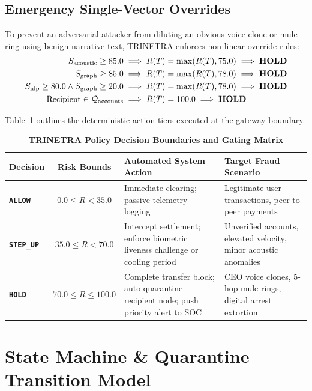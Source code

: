 \documentclass[11pt,a4paper]{article}
\begin{document}
\subsection{Emergency Single-Vector Overrides}
To prevent an adversarial attacker from diluting an obvious voice clone or mule ring using benign narrative text, TRINETRA enforces non-linear override rules:
\begin{align}
    S_{\text{acoustic}} \ge 85.0 &\implies R(T) = \max(R(T), 75.0) \implies \text{\textbf{HOLD}}\\
    S_{\text{graph}} \ge 85.0 &\implies R(T) = \max(R(T), 78.0) \implies \text{\textbf{HOLD}}\\
    S_{\text{nlp}} \ge 80.0 \land S_{\text{graph}} \ge 20.0 &\implies R(T) = \max(R(T), 78.0) \implies \text{\textbf{HOLD}}\\
    \text{Recipient} \in \mathcal{Q}_{\text{accounts}} &\implies R(T) = 100.0 \implies \text{\textbf{HOLD}}
\end{align}

Table~\ref{tab:decisions} outlines the deterministic action tiers executed at the gateway boundary.

\begin{table}[!ht]
\centering
\small
\caption{\textbf{TRINETRA Policy Decision Boundaries and Gating Matrix}}
\label{tab:decisions}
\begin{tabularx}{\textwidth}{lcp{3.4cm}X}
\toprule
\textbf{Decision} & \textbf{Risk Bounds} & \textbf{Automated System Action} & \textbf{Target Fraud Scenario} \\
\midrule
\texttt{\textbf{ALLOW}} & $0.0 \le R < 35.0$ & Immediate clearing; passive telemetry logging & Legitimate user transactions, peer-to-peer payments \\
\addlinespace
\texttt{\textbf{STEP\_UP}} & $35.0 \le R < 70.0$ & Intercept settlement; enforce biometric liveness challenge or cooling period & Unverified accounts, elevated velocity, minor acoustic anomalies \\
\addlinespace
\texttt{\textbf{HOLD}} & $70.0 \le R \le 100.0$ & Complete transfer block; auto-quarantine recipient node; push priority alert to SOC & CEO voice clones, 5-hop mule rings, digital arrest extortion \\
\bottomrule
\end{tabularx}
\end{table}

\section{State Machine \& Quarantine Transition Model}
\label{sec:state_machine}
\end{document}
